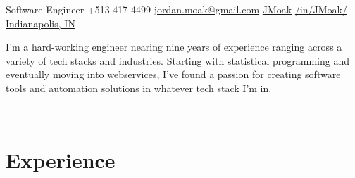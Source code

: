 \documentclass[]{moak-resume}
\begin{document}
            {Software Engineer}
            {\icon{\faPhone} +513 417 4499}
            {\icon{\faEnvelope[regular]} \href{mailto:ordan.moak@gmail.com}{ jordan.moak@gmail.com}}
            {\icon{\faGithub} \href{https://github.com/JMoak/}{ JMoak}}
            {\icon{\faLinkedin} \href{https://www.linkedin.com/JMoak}{ /in/JMoak/}}
            {\icon{\faMapMarker} \href{https://www.google.com/maps/place/Indianapolis,+IN/@39.7794476,-86.412935,10z/data=!3m1!4b1!4m5!3m4!1s0x886b50ffa7796a03:0xd68e9df640b9ea7c!8m2!3d39.768403!4d-86.158068}{ Indianapolis, IN}}

\begin{aside}
  \small\bodyfont I'm a hard-working engineer nearing nine years of experience ranging across a variety of tech stacks and industries.  Starting with statistical programming and eventually moving into webservices, I've found a passion for creating software tools and automation solutions in whatever tech stack I'm in.
	\programmingPie{}
  ~
  ~
\end{aside}
~
\section{Experience}
\end{document}
